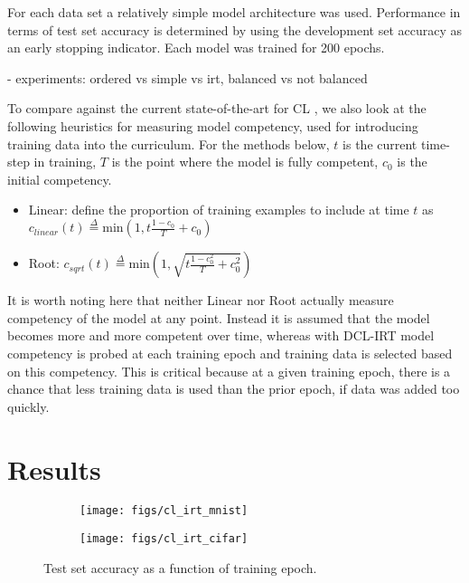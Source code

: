 \documentclass[letterpaper]{article} %
\begin{document}
For each data set a relatively simple model architecture was used.
Performance in terms of test set accuracy is determined by using the development set accuracy as an early stopping indicator.
Each model was trained for 200 epochs. 

- experiments: ordered vs simple vs irt, balanced vs not balanced

To compare against the current state-of-the-art for CL \cite{platanios_competence-based_2019}, we also look at the following heuristics for measuring model competency, used for introducing training data into the curriculum.
For the methods below, $t$ is the current time-step in training, $T$ is the point where the model is fully competent, $c_0$ is the initial competency. 

\begin{itemize}
	\item 
	Linear: define the proportion of training examples to include at time $t$ as $c_{linear}(t) \overset{\Delta}{=} \text{min} (1, t\frac{1-c_0}{T} + c_0)$
	\item 
	Root: $c_{sqrt}(t) \overset{\Delta}{=} \text{min}(1, \sqrt{t\frac{1-c_0^2}{T} + c_0^2})$
\end{itemize}

It is worth noting here that neither Linear nor Root actually measure competency of the model at any point. 
Instead it is assumed that the model becomes more and more competent over time, whereas with DCL-IRT model competency is probed at each training epoch and training data is selected based on this competency.
This is critical because at a given training epoch, there is a chance that less training data is used than the prior epoch, if data was added too quickly.

\section{Results} 


\captionsetup[subfigure]{labelformat=empty}
\begin{figure*}[th!]
	\centering
	\begin{subfigure}[b]{0.45\textwidth}
		\centering
		\texttt{[image: figs/cl\_irt\_mnist]}
		\caption{\label{fig:cl_mnist}} 
		\vspace{-2em} 
	\end{subfigure} 
	\begin{subfigure}[b]{0.45\textwidth}
		\centering
		\texttt{[image: figs/cl\_irt\_cifar]}
		\caption{\label{fig:cl_cifar}} 
		\vspace{-2em} 
	\end{subfigure} 
	
	\caption{Test set accuracy as a function of training epoch.}
	\label{fig:acc_viz}
\end{figure*}
\end{document}
